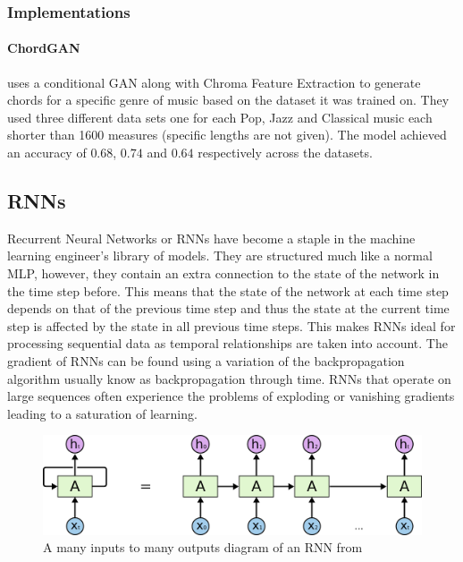 \subsubsection{Implementations}

\paragraph{ChordGAN} \cite{ChordGAN} uses a conditional GAN along with Chroma Feature Extraction to generate chords for a specific genre of music based on the dataset it was trained on.
They used three different data sets one for each Pop, Jazz and Classical music each shorter than 1600 measures (specific lengths are not given).
The model achieved an accuracy of $0.68$, $0.74$ and $0.64$ respectively across the datasets.

\subsection{RNNs}

Recurrent Neural Networks or RNNs have become a staple in the machine learning engineer's library of models. 
They are structured much like a normal MLP, however, they contain an extra connection to the state of the network in the time step before.
This means that the state of the network at each time step depends on that of the previous time step and thus the state at the current time step is affected by the state in all previous time steps.
This makes RNNs ideal for processing sequential data as temporal relationships are taken into account.
The gradient of RNNs can be found using a variation of the backpropagation algorithm usually know as backpropagation through time.
RNNs that operate on large sequences often experience the problems of exploding or vanishing gradients leading to a saturation of learning.

\begin{figure}
    \centering
    \includegraphics[width=0.8\columnwidth]{Figures/RNN}
    \decoRule
    \caption[An RNN]{A many inputs to many outputs diagram of an RNN from \cite{oinkina}}
    \label{fig:RNN}
\end{figure}

